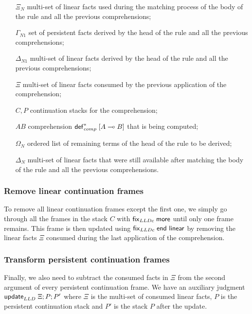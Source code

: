 \begin{enumerate}
   \item[$\Xi_N$] multi-set of linear facts used during the matching process of
   the body of the rule and all the previous comprehensions;
   \item[$\Gamma_{N1}$] set of persistent facts derived by the head of the rule
   and all the previous comprehensions;
   \item[$\Delta_{N1}$] multi-set of linear facts derived by the head of the
   rule and all the previous comprehensions;
   \item[$\Xi$] multi-set of linear facts consumed by the previous application
   of the comprehension;
   \item[$C, P$] continuation stacks for the comprehension;
   \item[$AB$] comprehension $\mathsf{def}_{comp}^{*} \; [A \multimap B]$ that is being computed;
   \item[$\Omega_N$] ordered list of remaining terms of the head of the rule to
   be derived;
   \item[$\Delta_N$] multi-set of linear facts that were still available after
   matching the body of the rule and all the previous comprehensions.
\end{enumerate}

\subsubsection{Remove linear continuation frames}

To remove all linear continuation frames except the first one, we simply go through all the frames in the stack $C$ with $\mathsf{fix}_{LLDc} \; \mathsf{more}$
until only one frame remains. This frame is then updated using $\mathsf{fix}_{LLDc} \; \mathsf{end~linear}$ by removing the linear facts $\Xi$ consumed
during the last application of the comprehension.



\subsubsection{Transform persistent continuation frames}

Finally, we also need to subtract the consumed facts in $\Xi$ from the second
argument of every persistent continuation frame.  We have an auxiliary judgment
$\mathsf{update}_{LLD} \; \Xi; P; P'$ where $\Xi$ is the multi-set of consumed linear facts, $P$
is the persistent continuation stack and $P'$ is the stack $P$ after the update.

